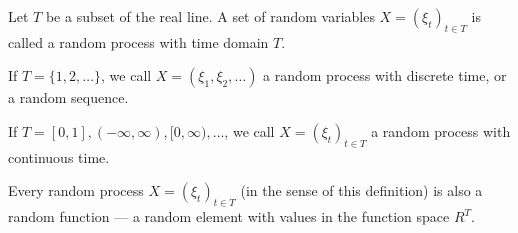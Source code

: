 Let $T$ be a subset of the real line. A set of random variables $X = (\xi_t)_{t \in T}$ is called a random process with time domain $T$.

If $T = \{1, 2, \ldots\}$, we call $X = (\xi_1, \xi_2, \ldots)$ a random process with discrete time, or a random sequence.

If $T = [0, 1], (-\infty, \infty), [0, \infty), \ldots$, we call $X = (\xi_t)_{t \in T}$ a random process with continuous time.

Every random process $X = (\xi_t)_{t \in T}$ (in the sense of this definition) is also a random function — a random element with values in the function space $R^T$.
